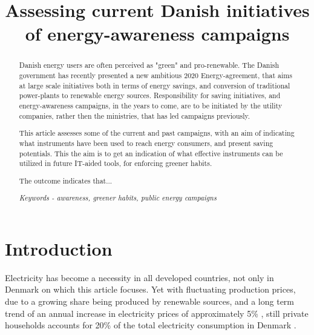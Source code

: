 \documentclass[journal]{IEEEtran}
\begin{document}
%
\title{Assessing current Danish initiatives of energy-awareness campaigns }


\author{
}









\maketitle


\begin{abstract}
Danish energy users are often perceived as "green" and pro-renewable. The Danish government has recently presented a new ambitious 2020 Energy-agreement, that aims at large scale initiatives both in terms of energy savings, and conversion of traditional power-plants to renewable energy sources.
Responsibility for saving initiatives, and energy-awareness campaigns, in the years to come, are to be initiated by the utility companies, rather then the ministries, that has led campaigns previously.

This article assesses some of the current and past campaigns, with an aim of indicating what instruments have been used to reach energy consumers, and present saving potentials. This the aim is to get an indication of what effective instruments can be utilized in future IT-aided tools, for enforcing greener habits.

The outcome indicates that...

\textit{Keywords - awareness, greener habits, public energy campaigns}
\end{abstract}

 

\section{Introduction}
Electricity has become a necessity in all developed countries, not only in Denmark on which this article focuses. Yet with fluctuating production prices, due to a growing share being produced by renewable sources, and a long term trend of an annual increase in electricity prices of approximately 5\% \cite{udv_elpriser}, still private households accounts for 20\% of the total electricity consumption in Denmark \cite{energistat}.
\end{document}
